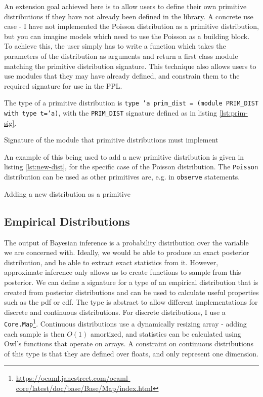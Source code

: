 An extension goal achieved here is to allow users to define their own primitive distributions if they have not already been defined in the library. A concrete use case - I have not implemented the Poisson distribution as a primitive distribution, but you can imagine models which need to use the Poisson as a building block. To achieve this, the user simply has to write a function which takes the parameters of the distribution as arguments and return a first class module matching the primitive distribution signature. This technique also allows users to use modules that they may have already defined, and constrain them to the required signature for use in the PPL.

The type of a primitive distribution is \texttt{type 'a prim\_dist = (module PRIM\_DIST with type t='a)}, with the \texttt{PRIM\_DIST} signature defined as in listing \ref{lst:prim-sig}. 

\begin{listing}[!ht]
	\caption{Signature of the module that primitive distributions must implement}
	\label{lst:prim-sig}
\end{listing}

An example of this being used to add a new primitive distribution is given in listing \ref{lst:new-dist}, for the specific case of the Poisson distribution. The \texttt{Poisson} distribution can be used as other primitives are, e.g. in \texttt{observe} statements.

\begin{listing}[!ht]
	\caption{Adding a new distribution as a primitive}
	\label{lst:new-dist}
\end{listing}

\subsection{Empirical Distributions}

The output of Bayesian inference is a probability distribution over the variable we are concerned with. Ideally, we would be able to produce an exact posterior distribution, and be able to extract exact statistics from it. However, approximate inference only allows us to create functions to sample from this posterior. We can define a signature for a type of an empirical distribution that is created from posterior distributions and can be used to calculate useful properties such as the pdf or cdf. The type is abstract to allow different implementations for discrete and continuous distributions. For discrete distributions, I use a \texttt{Core.Map}\footnote{\url{https://ocaml.janestreet.com/ocaml-core/latest/doc/base/Base/Map/index.html}}. Continuous distributions use a dynamically resizing array - adding each sample is then $O(1)$ amortized, and statistics can be calculated using Owl's functions that operate on arrays. A constraint on continuous distributions of this type is that they are defined over floats, and only represent one dimension.

